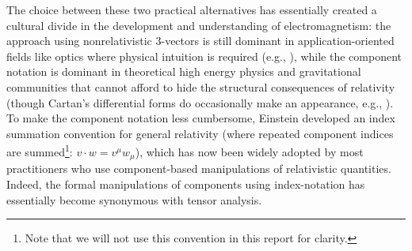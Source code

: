 \documentclass[1p,sort&compress]{elsarticle}
\numberwithin{equation}{section}
\begin{document}
The choice between these two practical alternatives has essentially created a cultural divide in the development and understanding of electromagnetism: the approach using nonrelativistic 3-vectors is still dominant in application-oriented fields like optics where physical intuition is required (e.g., \cite{Jackson1999}), while the component notation is dominant in theoretical high energy physics and gravitational communities that cannot afford to hide the structural consequences of relativity (though Cartan's differential forms do occasionally make an appearance, e.g.,  \cite{Goeckeler1989}). To make the component notation less cumbersome, Einstein developed an index summation convention for general relativity \cite{Einstein1916} (where repeated component indices are summed\footnote{Note that we will not use this convention in this report for clarity.}: $v\cdot w = v^\mu w_\mu$), which has now been widely adopted by most practitioners who use component-based manipulations of relativistic quantities.  Indeed, the formal manipulations of components using index-notation has essentially become synonymous with tensor analysis.
\end{document}
